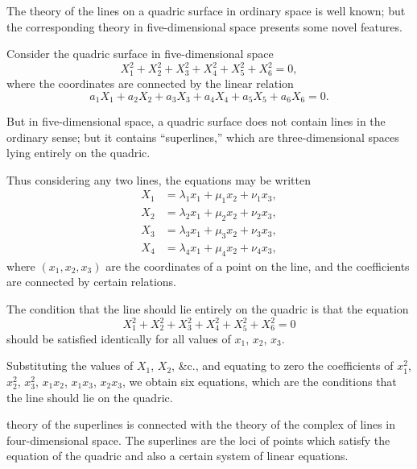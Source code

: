 \documentclass[11pt,a4paper]{book}
\begin{document}
\newpage


The theory of the lines on a quadric surface in ordinary space is well known; but the corresponding theory in five-dimensional space presents some novel features.

Consider the quadric surface in five-dimensional space
\[
X_1^2 + X_2^2 + X_3^2 + X_4^2 + X_5^2 + X_6^2 = 0,
\]
where the coordinates are connected by the linear relation
\[
a_1X_1 + a_2X_2 + a_3X_3 + a_4X_4 + a_5X_5 + a_6X_6 = 0.
\]

But in five-dimensional space, a quadric surface does not contain lines in the ordinary sense; but it contains ``superlines,'' which are three-dimensional spaces lying entirely on the quadric.

\newpage

Thus considering any two lines, the equations may be written
\begin{align*}
X_1 &= \lambda_1 x_1 + \mu_1 x_2 + \nu_1 x_3, \\
X_2 &= \lambda_2 x_1 + \mu_2 x_2 + \nu_2 x_3, \\
X_3 &= \lambda_3 x_1 + \mu_3 x_2 + \nu_3 x_3, \\
X_4 &= \lambda_4 x_1 + \mu_4 x_2 + \nu_4 x_3,
\end{align*}
where $(x_1, x_2, x_3)$ are the coordinates of a point on the line, and the coefficients are connected by certain relations.

The condition that the line should lie entirely on the quadric is that the equation
\[
X_1^2 + X_2^2 + X_3^2 + X_4^2 + X_5^2 + X_6^2 = 0
\]
should be satisfied identically for all values of $x_1$, $x_2$, $x_3$.

Substituting the values of $X_1$, $X_2$, \&c., and equating to zero the coefficients of $x_1^2$, $x_2^2$, $x_3^2$, $x_1x_2$, $x_1x_3$, $x_2x_3$, we obtain six equations, which are the conditions that the line should lie on the quadric.

\newpage

theory of the superlines is connected with the theory of the complex of lines in four-dimensional space. The superlines are the loci of points which satisfy the equation of the quadric and also a certain system of linear equations.
\end{document}
